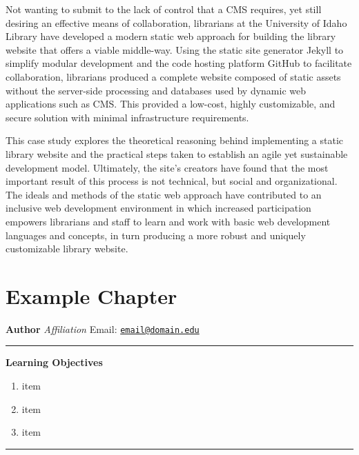 \documentclass{book}
\providecommand{\tightlist}{%
  \setlength{\itemsep}{0pt}\setlength{\parskip}{0pt}}
\begin{document}
Not wanting to submit to the lack of control that a CMS requires, yet still
desiring an effective means of collaboration, librarians at the University of
Idaho Library have developed a modern static web approach for building the
library website that offers a viable middle-way. Using the static site
generator Jekyll to simplify modular development and the code hosting platform
GitHub to facilitate collaboration, librarians produced a complete website
composed of static assets without the server-side processing and databases
used by dynamic web applications such as CMS. This provided a low-cost, highly
customizable, and secure solution with minimal infrastructure requirements.

This case study explores the theoretical reasoning behind implementing a
static library website and the practical steps taken to establish an agile yet
sustainable development model. Ultimately, the site's creators have found that
the most important result of this process is not technical, but social and
organizational. The ideals and methods of the static web approach have
contributed to an inclusive web development environment in which increased
participation empowers librarians and staff to learn and work with basic web
development languages and concepts, in turn producing a more robust and
uniquely customizable library website.

\hypertarget{example-chapter}{%
\chapter{Example Chapter}\label{example-chapter}}

\textbf{Author} \emph{Affiliation} Email:
\href{mailto:email@domain.edu}{\nolinkurl{email@domain.edu}}

\begin{center}\rule{0.5\linewidth}{0.5pt}\end{center}

\textbf{Learning Objectives}

\begin{enumerate}
\def\labelenumi{\arabic{enumi}.}
\tightlist
\item
  item
\item
  item
\item
  item
\end{enumerate}

\begin{center}\rule{0.5\linewidth}{0.5pt}\end{center}
\end{document}

